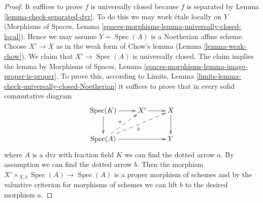 \documentclass[10pt,a4paper]{amsart}
\theoremstyle{plain}
\theoremstyle{definition}
\theoremstyle{remark}
\numberwithin{equation}{subsection}
\def\Spec{\mathop{\mathrm{Spec}}}
\begin{document}
\begin{proof}
It suffices to prove $f$ is universally closed because $f$ is separated by
Lemma \ref{lemma-check-separated-dvr}.
To do this we may work \'etale locally on $Y$
(Morphisms of Spaces, Lemma
\ref{spaces-morphisms-lemma-universally-closed-local}).
Hence we may assume $Y = \Spec(A)$ is a Noetherian affine scheme.
Choose $X' \to X$ as in the weak form of Chow's lemma
(Lemma \ref{lemma-weak-chow}). We claim that $X' \to \Spec(A)$
is universally closed. The claim implies the lemma by
Morphisms of Spaces, Lemma \ref{spaces-morphisms-lemma-image-proper-is-proper}.
To prove this, according to
Limits, Lemma \ref{limits-lemma-check-universally-closed-Noetherian}
it suffices to prove that in every solid commutative diagram
$$
\xymatrix{
\Spec(K) \ar[r] \ar[d] & X' \ar[r] & X \ar[d] \\
\Spec(A) \ar[rr] \ar@{-->}[ru]^a \ar@{-->}[rru]_b & & Y
}
$$
where $A$ is a dvr with fraction field $K$ we can find the
dotted arrow $a$. By assumption we can find the dotted arrow $b$.
Then the morphism $X' \times_{X, b} \Spec(A) \to \Spec(A)$
is a proper morphism of schemes and by the valuative criterion
for morphisms of schemes we can lift $b$ to the desired morphism $a$.
\end{proof}
\end{document}
